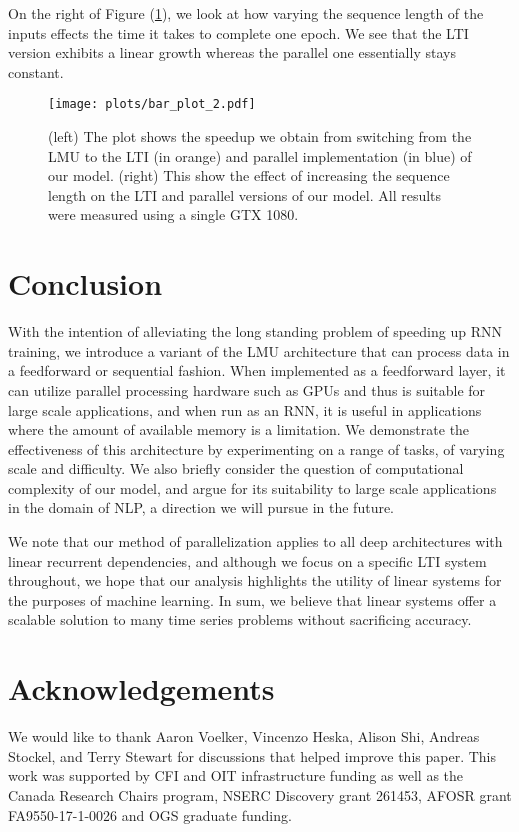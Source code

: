 \documentclass{article}
\begin{document}
On the right of Figure (\ref{fig:bar}), we look at how varying the sequence length of the inputs effects the time it takes to complete one epoch. We see that the LTI version exhibits a linear growth whereas the parallel one essentially stays constant.  

\begin{figure}
    \centering
    \texttt{[image: plots/bar\_plot\_2.pdf]}
    \caption{(left) The plot shows the speedup we obtain from switching from the LMU to the LTI (in orange) and parallel implementation (in blue) of our model. (right)  This show the effect of increasing the sequence length on the LTI and parallel versions of our model. All results were measured using a single GTX 1080. }
    \label{fig:bar}
\end{figure}

\section{Conclusion}
With the intention of alleviating the long standing problem of speeding up RNN training, we introduce a variant of the LMU architecture that can process data in a feedforward or sequential fashion. When implemented as a feedforward layer, it can utilize parallel processing hardware such as GPUs and thus is suitable for large scale applications, and when run as an RNN, it is useful in applications where the amount of available memory is a limitation. We demonstrate the effectiveness of this architecture by experimenting on a range of tasks, of varying scale and difficulty. We also briefly consider the question of computational complexity of our model, and argue for its suitability to large scale applications in the domain of NLP, a direction we will pursue in the future. 

We note that our method of parallelization applies to all deep architectures with linear recurrent dependencies, and although we focus on a specific LTI system throughout, we hope that our analysis highlights the utility of linear systems for the purposes of machine learning. In sum, we believe that linear systems offer a scalable solution to many time series problems without sacrificing accuracy. 

\section*{Acknowledgements}
We would like to thank Aaron Voelker, Vincenzo Heska, Alison Shi, Andreas Stockel, and Terry Stewart for discussions that helped improve this paper. This work was supported by CFI and OIT infrastructure funding as well as the Canada Research Chairs program, NSERC Discovery grant 261453, AFOSR grant FA9550-17-1-0026 and OGS graduate funding.
\end{document}
